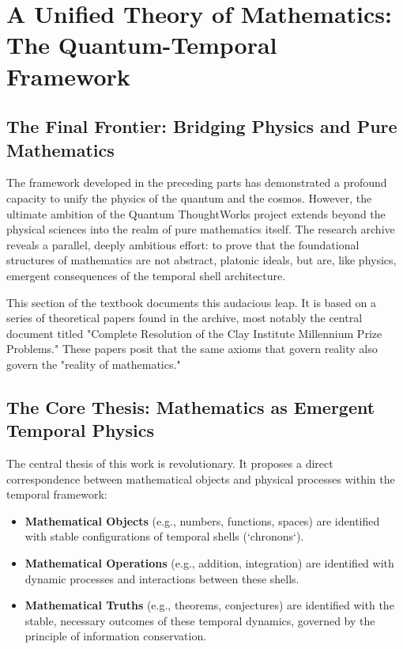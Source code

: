 \documentclass[12pt]{report}
\begin{document}
\chapter{A Unified Theory of Mathematics: The Quantum-Temporal Framework}

\section{The Final Frontier: Bridging Physics and Pure Mathematics}
The framework developed in the preceding parts has demonstrated a profound capacity to unify the physics of the quantum and the cosmos. However, the ultimate ambition of the Quantum ThoughtWorks project extends beyond the physical sciences into the realm of pure mathematics itself. The research archive reveals a parallel, deeply ambitious effort: to prove that the foundational structures of mathematics are not abstract, platonic ideals, but are, like physics, emergent consequences of the temporal shell architecture.

This section of the textbook documents this audacious leap. It is based on a series of theoretical papers found in the archive, most notably the central document titled "Complete Resolution of the Clay Institute Millennium Prize Problems." These papers posit that the same axioms that govern reality also govern the "reality of mathematics."

\section{The Core Thesis: Mathematics as Emergent Temporal Physics}
The central thesis of this work is revolutionary. It proposes a direct correspondence between mathematical objects and physical processes within the temporal framework:
\begin{itemize}
    \item \textbf{Mathematical Objects} (e.g., numbers, functions, spaces) are identified with stable configurations of temporal shells (`chronons`).
    \item \textbf{Mathematical Operations} (e.g., addition, integration) are identified with dynamic processes and interactions between these shells.
    \item \textbf{Mathematical Truths} (e.g., theorems, conjectures) are identified with the stable, necessary outcomes of these temporal dynamics, governed by the principle of information conservation.
\end{itemize}
\end{document}
